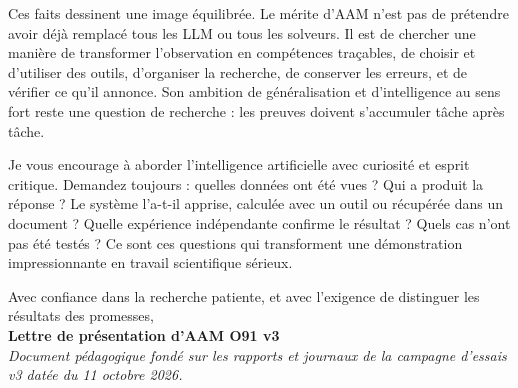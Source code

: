 \documentclass[11pt,a4paper]{article}
\begin{document}
Ces faits dessinent une image équilibrée. Le mérite d'AAM n'est pas de prétendre avoir déjà remplacé tous les LLM ou tous les solveurs. Il est de chercher une manière de transformer l'observation en compétences traçables, de choisir et d'utiliser des outils, d'organiser la recherche, de conserver les erreurs, et de vérifier ce qu'il annonce. Son ambition de généralisation et d'intelligence au sens fort reste une question de recherche : les preuves doivent s'accumuler tâche après tâche.

Je vous encourage à aborder l'intelligence artificielle avec curiosité et esprit critique. Demandez toujours : quelles données ont été vues ? Qui a produit la réponse ? Le système l'a-t-il apprise, calculée avec un outil ou récupérée dans un document ? Quelle expérience indépendante confirme le résultat ? Quels cas n'ont pas été testés ? Ce sont ces questions qui transforment une démonstration impressionnante en travail scientifique sérieux.

\vspace{10pt}
\noindent Avec confiance dans la recherche patiente, et avec l'exigence de distinguer les résultats des promesses,\\[7pt]
\noindent\textbf{Lettre de présentation d'AAM O91 v3}\\
\textit{Document pédagogique fondé sur les rapports et journaux de la campagne d'essais v3 datée du 11 octobre 2026.}
\end{document}
